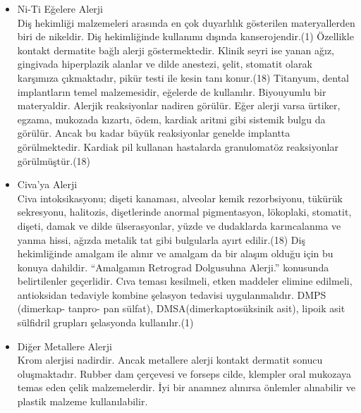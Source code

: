 \begin{itemize}
   \item Ni-Ti Eğelere Alerji \\
   Diş hekimliği malzemeleri arasında en çok duyarlılık gösterilen materyallerden biri de nikeldir. Diş hekimliğinde kullanımı dışında kanserojendir.(1) Özellikle kontakt dermatite bağlı alerji göstermektedir. Klinik seyri ise yanan ağız, gingivada hiperplazik alanlar ve dilde anestezi, şelit, stomatit olarak karşımıza çıkmaktadır, pikür testi ile kesin tanı konur.(18)
Titanyum, dental implantların temel malzemesidir, eğelerde de kullanılır. Biyouyumlu bir materyaldir. Alerjik reaksiyonlar nadiren görülür. Eğer alerji varsa ürtiker, egzama, mukozada kızartı, ödem, kardiak aritmi gibi sistemik bulgu da görülür.  Ancak bu kadar büyük reaksiyonlar genelde implantta görülmektedir. Kardiak pil kullanan hastalarda granulomatöz reaksiyonlar görülmüştür.(18)

   \item Civa'ya Alerji \\
   Civa intoksikasyonu; dişeti kanaması, alveolar kemik rezorbsiyonu, tükürük sekresyonu, halitozis, dişetlerinde anormal pigmentasyon, lökoplaki, stomatit, dişeti, damak ve dilde ülserasyonlar, yüzde ve dudaklarda karıncalanma ve yanma hissi, ağızda metalik tat gibi bulgularla ayırt edilir.(18) Diş hekimliğinde amalgam ile alınır ve amalgam da bir alaşım olduğu için bu konuya dahildir. “Amalgamın Retrograd Dolgusuhna Alerji.”  konusunda belirtilenler geçerlidir.
Cıva teması kesilmeli, etken maddeler elimine edilmeli, antioksidan tedaviyle kombine şelasyon tedavisi uygulanmalıdır. DMPS (dimerkap- tanpro- pan sülfat), DMSA(dimerkaptosüksinik asit), lipoik asit sülfidril grupları şelasyonda kullanılır.(1)

   \item Diğer Metallere Alerji\\
   Krom alerjisi nadirdir. Ancak metallere alerji kontakt dermatit sonucu oluşmaktadır. Rubber dam çerçevesi ve forseps cilde, klempler oral mukozaya temas eden çelik malzemelerdir. İyi bir anamnez alınırsa önlemler alınabilir ve plastik malzeme kullanılabilir. 
\end{itemize}



